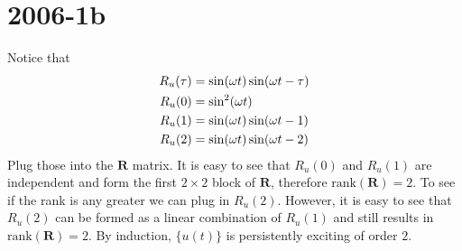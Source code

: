 \documentclass[lecture,12pt,]{pcms-l}
\begin{document}
\section{2006-1b}
Notice that
\begin{align*}
R_u(\tau) &= \sin(\omega t)\sin(\omega t-\tau) \\
R_u(0) &= \sin^2(\omega t) \\
R_u(1) &= \sin(\omega t)\sin(\omega t-1) \\
R_u(2) &= \sin(\omega t)\sin(\omega t-2)
\end{align*}
Plug those into the $\mathbf{R}$ matrix. It is easy to see that $R_u(0)$ and $R_u(1)$ are independent and form the first $2\times 2$ block of $\mathbf{R}$, therefore $\text{rank}(\mathbf{R})=2$. To see if the rank is any greater we can plug in $R_u(2)$. However, it is easy to see that $R_u(2)$ can be formed as a linear combination of $R_u(1)$ and still results in $\text{rank}(\mathbf{R})=2$. By induction, $\{u(t)\}$ is persistently exciting of order $2$.
\end{document}
